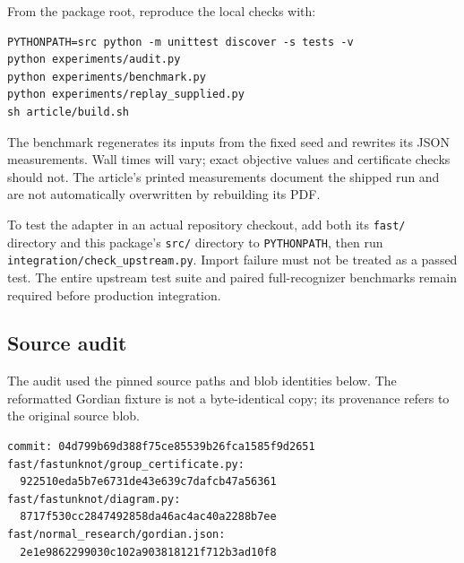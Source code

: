 \documentclass[11pt,letterpaper]{article}
\theoremstyle{definition}\newtheorem{definition}[theorem]{Definition}
\begin{document}
From the package root, reproduce the local checks with:
\begin{lstlisting}
PYTHONPATH=src python -m unittest discover -s tests -v
python experiments/audit.py
python experiments/benchmark.py
python experiments/replay_supplied.py
sh article/build.sh
\end{lstlisting}
The benchmark regenerates its inputs from the fixed seed and rewrites its JSON measurements. Wall times will vary; exact objective values and certificate checks should not. The article's printed measurements document the shipped run and are not automatically overwritten by rebuilding its PDF.

To test the adapter in an actual repository checkout, add both its \texttt{fast/} directory and this package's \texttt{src/} directory to \texttt{PYTHONPATH}, then run \texttt{integration/check\_upstream.py}. Import failure must not be treated as a passed test. The entire upstream test suite and paired full-recognizer benchmarks remain required before production integration.

\subsection*{Source audit}
The audit used the pinned source paths and blob identities below. The reformatted Gordian fixture is not a byte-identical copy; its provenance refers to the original source blob.
\begin{lstlisting}
commit: 04d799b69d388f75ce85539b26fca1585f9d2651
fast/fastunknot/group_certificate.py:
  922510eda5b7e6731de43e639c7dafcb47a56361
fast/fastunknot/diagram.py:
  8717f530cc2847492858da46ac4ac40a2288b7ee
fast/normal_research/gordian.json:
  2e1e9862299030c102a903818121f712b3ad10f8
\end{lstlisting}
\end{document}
